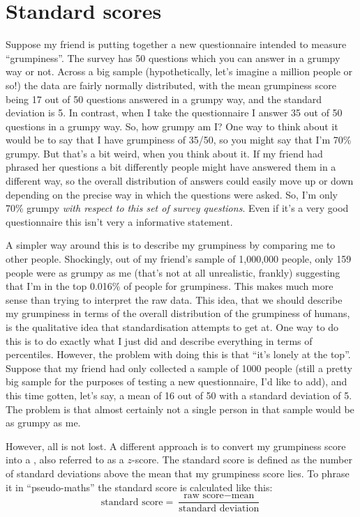 \section{Standard scores~\label{sec:zscore}}

Suppose my friend is putting together a new questionnaire intended to measure ``grumpiness''. The survey has 50 questions which you can answer in a grumpy way or not. Across a big sample (hypothetically, let's imagine a million people or so!) the data are fairly normally distributed, with the mean grumpiness score being 17 out of 50 questions answered in a grumpy way, and the standard deviation is 5. In contrast, when I take the questionnaire I answer 35 out of 50 questions in a grumpy way. So, how grumpy am I? One way to think about it would be to say that I have grumpiness of 35/50, so you might say that I'm 70\% grumpy. But that's a bit weird, when you think about it. If my friend had phrased her questions a bit differently people might have answered them in a different way, so the overall distribution of answers could easily move up or down depending on the precise way in which the questions were asked. So, I'm only 70\% grumpy {\it with respect to this set of survey questions}. Even if it's a very good questionnaire this isn't very a informative statement. 

A simpler way around this is to describe my grumpiness by comparing me to other people. Shockingly, out of my friend's sample of 1,000,000 people, only 159 people were as grumpy as me (that's not at all unrealistic, frankly) suggesting that I'm in the top 0.016\% of people for grumpiness. This makes much more sense than trying to interpret the raw data. This idea, that we should describe my grumpiness in terms of the overall distribution of the grumpiness of humans, is the qualitative idea that standardisation attempts to get at. One way to do this is to do exactly what I just did and describe everything in terms of percentiles. However, the problem with doing this is that ``it's lonely at the top''. Suppose that my friend had only collected a sample of 1000 people (still a pretty big sample for the purposes of testing a new questionnaire, I'd like to add), and this time gotten, let's say, a mean of 16 out of 50 with a standard deviation of 5. The problem is that almost certainly not a single person in that sample would be as grumpy as me.

However, all is not lost. A different approach is to convert my grumpiness score into a , also referred to as a $z$-score. The standard score is defined as the number of standard deviations above the mean that my grumpiness score lies. To phrase it in ``pseudo-maths'' the standard score is calculated like this:
$$
\mbox{standard score} = \frac{\mbox{raw score} - \mbox{mean}}{\mbox{standard deviation}}
$$ 

